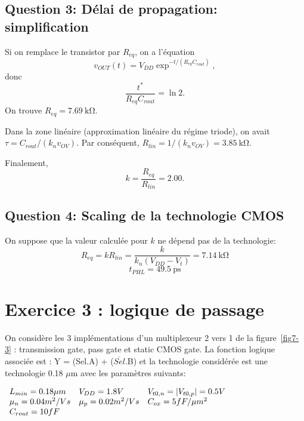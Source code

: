 \documentclass[frenchb,DIV=14]{scrartcl}
\begin{document}
\subsection*{Question 3: Délai de propagation: simplification}

Si on remplace le transistor par $R_{eq}$, on a l'équation
\[v_{OUT}(t) = V_{DD} \exp^{-t/(R_{eq}C_{rout})},\]
donc \[\frac{t^*}{R_{eq}C_{rout}} = \ln 2.\]
On trouve $R_{eq} = \SI{7.69}{\kilo\ohm}$.

Dans la zone linéaire (approximation linéaire du régime triode),
on avait $\tau = C_{rout} / (k_n v_{OV})$. Par conséquent,
$R_{lin} = 1 / (k_n v_{OV}) = \SI{3.85}{\kilo\ohm}$.

Finalement,
\[k = \frac{R_{eq}}{R_{lin}} = 2.00.\]

\subsection*{Question 4: Scaling de la technologie CMOS}

On suppose que la valeur calculée pour $k$ ne dépend pas de la technologie:
\[R_{eq} = k R_{lin} = \frac{k}{k_n (V_{DD} - V_t)} = \SI{7.14}{\kilo\ohm} \]
\[t_{PHL} = \SI{49.5}{\pico\second} \]

\newpage
\section*{Exercice 3 : logique de passage}
On considère les 3 implémentations d'un multiplexeur 2 vers 1 de la figure~\ref{fig7-3} :
transmission gate, pass gate et static CMOS gate. La fonction logique associée est :
Y = (Sel.A) + ($\overline{Sel}$.B) et la technologie considérée est une technologie
0.18 $\mu$m avec les paramètres suivants:

\begin{center}
$
	\begin{array}{l l l}
		L_{min} = 0.18 \mu m 	& V_{DD} = 1.8 V 		& V_{t0,n} = |V_{t0,p} | = 0.5 V \\
		\mu_n = 0.04 m^2/Vs 	& \mu_p = 0.02 m^2/Vs	& C_{ox} = 5 fF/\mu m^2 \\
		C_{rout} = 10fF			&						& \\
	\end{array}
$
\end{center}
\end{document}
